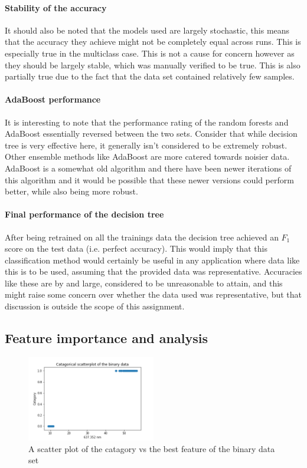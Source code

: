 \documentclass[british]{article}
\begin{document}
	\paragraph{Stability of the accuracy} It should also be noted that the models used are largely stochastic, this means that the accuracy they achieve might not be completely equal across runs. This is especially true in the multiclass case. This is not a cause for concern however as they should be largely stable, which was manually verified to be true. This is also partially true due to the fact that the data set contained relatively few samples. 
	
	\paragraph{AdaBoost performance}It is interesting to note that the performance rating of the random forests and AdaBoost essentially reversed between the two sets. Consider that while decision tree is very effective here, it generally isn't considered to be extremely robust. Other ensemble methods like AdaBoost are more catered towards noisier data. AdaBoost is a somewhat old algorithm \autocite{Freund1997} and there have been newer iterations of this algorithm \autocite{NormalHedge, Otten2016, Vente2016} and it would be possible that these newer versions could perform better, while also being more robust.  
	
	\paragraph{Final performance of the decision tree}After being retrained on all the trainings data the decision tree achieved an $F_1$ score on the test data (i.e. perfect accuracy). This would imply that this classification method would certainly be useful in any application where data like this is to be used, assuming that the provided data was representative. Accuracies like these are by and large, considered to be unreasonable to attain, and this might raise some concern over whether the data used was representative, but that discussion is outside the scope of this assignment.
	
	\subsection{Feature importance and analysis}
	
	\begin{figure}[!ht]
		\centering
		\includegraphics[width=0.5\textwidth]{binaryScatterplot}
		\caption{A scatter plot of the catagory vs the best feature of the binary data set}
		\label{binaryScatterplot}
	\end{figure}
	
\end{document}
